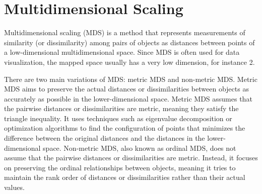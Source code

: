 \section{Multidimensional Scaling\label{Sec:DR:MDS}}
Multidimensional scaling (MDS) is a method that represents measurements of similarity (or dissimilarity) among pairs of objects as distances between points of a low-dimensional multidimensional space. Since MDS is often used for data visualization, the mapped space usually has a very low dimension, for instance 2.

There are two main variations of MDS: metric MDS and non-metric MDS. Metric MDS aims to preserve the actual distances or dissimilarities between objects as accurately as possible in the lower-dimensional space. Metric MDS assumes that the pairwise distances or dissimilarities are metric, meaning they satisfy the triangle inequality. It uses techniques such as eigenvalue decomposition or optimization algorithms to find the configuration of points that minimizes the difference between the original distances and the distances in the lower-dimensional space. Non-metric MDS, also known as ordinal MDS, does not assume that the pairwise distances or dissimilarities are metric. Instead, it focuses on preserving the ordinal relationships between objects, meaning it tries to maintain the rank order of distances or dissimilarities rather than their actual values.

